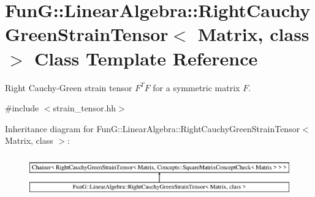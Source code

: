 \hypertarget{classFunG_1_1LinearAlgebra_1_1RightCauchyGreenStrainTensor}{}\section{FunG\+:\+:Linear\+Algebra\+:\+:Right\+Cauchy\+Green\+Strain\+Tensor$<$ Matrix, class $>$ Class Template Reference}
\label{classFunG_1_1LinearAlgebra_1_1RightCauchyGreenStrainTensor}


Right Cauchy-\/\+Green strain tensor $ F^T F $ for a symmetric matrix $ F $.  




{\ttfamily \#include $<$strain\+\_\+tensor.\+hh$>$}

Inheritance diagram for FunG\+:\+:Linear\+Algebra\+:\+:Right\+Cauchy\+Green\+Strain\+Tensor$<$ Matrix, class $>$\+:\begin{figure}[H]
\begin{center}
\leavevmode
\includegraphics[height=1.830065cm]{classFunG_1_1LinearAlgebra_1_1RightCauchyGreenStrainTensor}
\end{center}
\end{figure}

